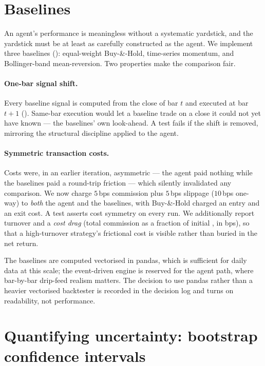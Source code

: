 \section{Baselines}
\label{sec:baselines}

An agent's performance is meaningless without a systematic yardstick, and the yardstick must
be at least as carefully constructed as the agent. We implement three baselines
(): equal-weight Buy-\&-Hold, time-series momentum, and
Bollinger-band mean-reversion. Two properties make the comparison fair.

\paragraph{One-bar signal shift.} Every baseline signal is computed from the close of bar
$t$ and executed at bar $t{+}1$ (). Same-bar execution
would let a baseline trade on a close it could not yet have known --- the baselines' own
look-ahead. A test fails if the shift is removed, mirroring the structural discipline applied
to the agent.

\paragraph{Symmetric transaction costs.} Costs were, in an earlier iteration, asymmetric ---
the agent paid nothing while the baselines paid a round-trip friction --- which silently
invalidated any comparison. We now charge $5$\,bps commission plus $5$\,bps slippage
($10$\,bps one-way) to \emph{both} the agent and the baselines, with Buy-\&-Hold charged an
entry and an exit cost. A test asserts cost symmetry on every run. We additionally report
turnover and a \emph{cost drag} (total commission as a fraction of initial \nav, in bps), so
that a high-turnover strategy's frictional cost is visible rather than buried in the net
return.

The baselines are computed vectorised in pandas, which is sufficient for daily data at this
scale; the event-driven engine is reserved for the agent path, where bar-by-bar drip-feed
realism matters. The decision to use pandas rather than a heavier vectorised backtester is
recorded in the decision log and turns on readability, not performance.

\section{Quantifying uncertainty: bootstrap confidence intervals}
\label{sec:bootstrap}


